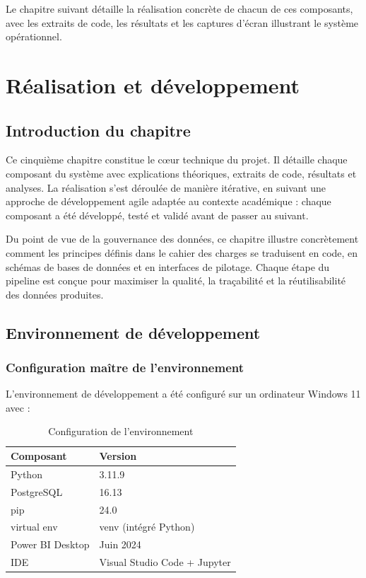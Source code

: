 \documentclass[a4paper,12pt]{report}
\begin{document}
Le chapitre suivant détaille la réalisation concrète de chacun de ces composants, avec les extraits de code, les résultats et les captures d'écran illustrant le système opérationnel.

\chapter{Réalisation et développement}

\section*{Introduction du chapitre}

Ce cinquième chapitre constitue le c\oe{}ur technique du projet. Il détaille chaque composant du système avec explications théoriques, extraits de code, résultats et analyses. La réalisation s'est déroulée de manière itérative, en suivant une approche de développement agile adaptée au contexte académique : chaque composant a été développé, testé et validé avant de passer au suivant.

Du point de vue de la gouvernance des données, ce chapitre illustre concrètement comment les principes définis dans le cahier des charges se traduisent en code, en schémas de bases de données et en interfaces de pilotage. Chaque étape du pipeline est conçue pour maximiser la qualité, la traçabilité et la réutilisabilité des données produites.

\section{Environnement de développement}

\subsection{Configuration maître de l'environnement}

L'environnement de développement a été configuré sur un ordinateur Windows 11 avec :

\begin{table}[H]
\centering
\small
\caption{Configuration de l'environnement}
\begin{tabular}{|l|l|}
\hline
\textbf{Composant} & \textbf{Version} \\
\hline\hline
Python & 3.11.9 \\
\hline
PostgreSQL & 16.13 \\
\hline
pip & 24.0 \\
\hline
virtual env & venv (intégré Python) \\
\hline
Power BI Desktop & Juin 2024 \\
\hline
IDE & Visual Studio Code + Jupyter \\
\hline
\end{tabular}
\end{table}
\end{document}
